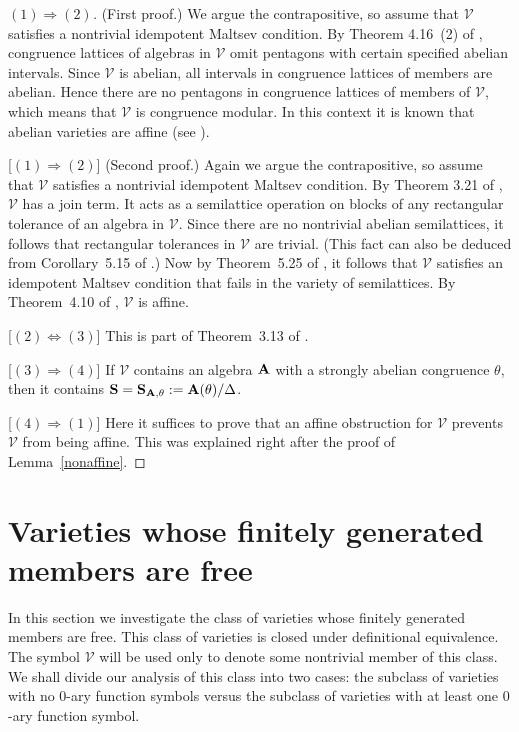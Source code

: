 \begin{proof}
  [$(1)\Rightarrow(2)$] (First proof.)
  We argue the contrapositive, so assume that $\mathcal V$ satisfies
  a nontrivial idempotent Maltsev condition.
  By Theorem 4.16~(2) of \cite{kearnes-kiss}, congruence
  lattices of algebras
  in $\mathcal V$ omit pentagons with certain specified
  abelian intervals. Since $\mathcal V$ is abelian,
  all intervals in congruence lattices of members are abelian.
  Hence there are no pentagons in congruence lattices of
  members of $\mathcal V$, which means that $\mathcal V$ is congruence
  modular. In this context it is known that
  abelian varieties are affine (see \cite{freese-mckenzie}).

[$(1)\Rightarrow(2)$] (Second proof.)
  Again we argue the contrapositive, so assume that $\mathcal V$ satisfies
  a nontrivial idempotent Maltsev condition.
  By Theorem 3.21 of \cite{kearnes-kiss}, $\mathcal V$ has a join term.
  It acts as a semilattice operation on blocks of any rectangular tolerance
  of an algebra in $\mathcal V$. Since there are no
  nontrivial abelian semilattices, it follows that
  rectangular tolerances in $\mathcal V$ are
  trivial. (This fact can also be deduced from Corollary~5.15 of
  \cite{kearnes-kiss}.) Now by Theorem~5.25 of \cite{kearnes-kiss},
  it follows that $\mathcal V$ satisfies an idempotent Maltsev condition
  that fails in the variety of semilattices. By Theorem~4.10
  of \cite{kearnes-szendrei}, $\mathcal V$ is affine.

[$(2)\Leftrightarrow(3)$]
This is part of Theorem~3.13 of \cite{kearnes-kiss}.

[$(3)\Rightarrow(4)$]
If $\mathcal V$ contains an algebra ${{\mathbf{\uppercase{a}}}}$ with a strongly
abelian congruence $\theta$, then it contains
${{\mathbf{\uppercase{s}}}} = {{\mathbf{\uppercase{s}}}}_{{{\mathbf{\uppercase{a}}}},\theta} :={{\mathbf{\uppercase{a}}}}(\theta)/\Delta$.

[$(4)\Rightarrow(1)$]
Here it suffices to prove that an affine obstruction
for $\mathcal V$ prevents $\mathcal V$ from being
affine. This was explained right after the proof
of Lemma~\ref{nonaffine}.
\end{proof}

\section{Varieties whose finitely generated members are free}
In this section we investigate the class of varieties 
whose finitely generated members are free. 
This class
of varieties is closed under definitional equivalence.
The symbol
$\mathcal V$ will be used only to denote some nontrivial member
of this class.
We shall divide our analysis of this class
into two cases: the subclass of 
varieties with no $0$-ary function symbols
versus 
the subclass of varieties with at least one $0$-ary function symbol.


